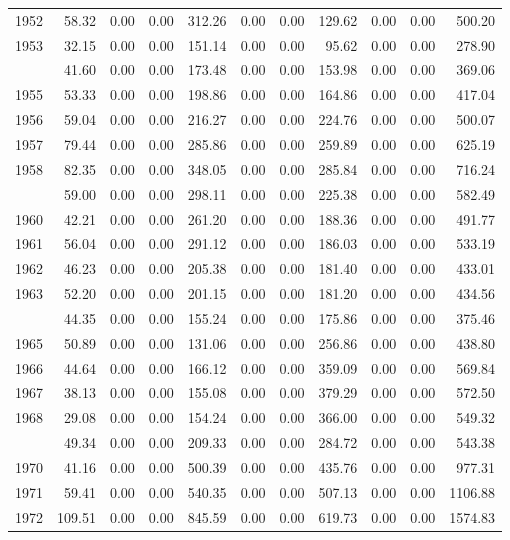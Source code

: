 \begin{longtable}[t]{rrrrrrrrrrr}
1952 & 58.32 & 0.00 & 0.00 & 312.26 & 0.00 & 0.00 & 129.62 & 0.00 & 0.00 & 500.20\\
1953 & 32.15 & 0.00 & 0.00 & 151.14 & 0.00 & 0.00 & 95.62 & 0.00 & 0.00 & 278.90\\
\addlinespace
1954 & 41.60 & 0.00 & 0.00 & 173.48 & 0.00 & 0.00 & 153.98 & 0.00 & 0.00 & 369.06\\
1955 & 53.33 & 0.00 & 0.00 & 198.86 & 0.00 & 0.00 & 164.86 & 0.00 & 0.00 & 417.04\\
1956 & 59.04 & 0.00 & 0.00 & 216.27 & 0.00 & 0.00 & 224.76 & 0.00 & 0.00 & 500.07\\
1957 & 79.44 & 0.00 & 0.00 & 285.86 & 0.00 & 0.00 & 259.89 & 0.00 & 0.00 & 625.19\\
1958 & 82.35 & 0.00 & 0.00 & 348.05 & 0.00 & 0.00 & 285.84 & 0.00 & 0.00 & 716.24\\
\addlinespace
1959 & 59.00 & 0.00 & 0.00 & 298.11 & 0.00 & 0.00 & 225.38 & 0.00 & 0.00 & 582.49\\
1960 & 42.21 & 0.00 & 0.00 & 261.20 & 0.00 & 0.00 & 188.36 & 0.00 & 0.00 & 491.77\\
1961 & 56.04 & 0.00 & 0.00 & 291.12 & 0.00 & 0.00 & 186.03 & 0.00 & 0.00 & 533.19\\
1962 & 46.23 & 0.00 & 0.00 & 205.38 & 0.00 & 0.00 & 181.40 & 0.00 & 0.00 & 433.01\\
1963 & 52.20 & 0.00 & 0.00 & 201.15 & 0.00 & 0.00 & 181.20 & 0.00 & 0.00 & 434.56\\
\addlinespace
1964 & 44.35 & 0.00 & 0.00 & 155.24 & 0.00 & 0.00 & 175.86 & 0.00 & 0.00 & 375.46\\
1965 & 50.89 & 0.00 & 0.00 & 131.06 & 0.00 & 0.00 & 256.86 & 0.00 & 0.00 & 438.80\\
1966 & 44.64 & 0.00 & 0.00 & 166.12 & 0.00 & 0.00 & 359.09 & 0.00 & 0.00 & 569.84\\
1967 & 38.13 & 0.00 & 0.00 & 155.08 & 0.00 & 0.00 & 379.29 & 0.00 & 0.00 & 572.50\\
1968 & 29.08 & 0.00 & 0.00 & 154.24 & 0.00 & 0.00 & 366.00 & 0.00 & 0.00 & 549.32\\
\addlinespace
1969 & 49.34 & 0.00 & 0.00 & 209.33 & 0.00 & 0.00 & 284.72 & 0.00 & 0.00 & 543.38\\
1970 & 41.16 & 0.00 & 0.00 & 500.39 & 0.00 & 0.00 & 435.76 & 0.00 & 0.00 & 977.31\\
1971 & 59.41 & 0.00 & 0.00 & 540.35 & 0.00 & 0.00 & 507.13 & 0.00 & 0.00 & 1106.88\\
1972 & 109.51 & 0.00 & 0.00 & 845.59 & 0.00 & 0.00 & 619.73 & 0.00 & 0.00 & 1574.83\\

\end{longtable}
